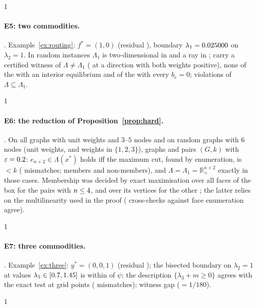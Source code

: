 \documentclass[11pt,a4paper]{article}
\providecommand{\HasCommodity}{0}
\providecommand{\HasHardness}{0}
\providecommand{\HasThree}{0}
\providecommand{\HasRouting}{0}
\theoremstyle{plain}
\theoremstyle{definition}
\theoremstyle{remark}
\newcommand{\R}{\mathbb{R}}
\newcommand{\Lam}{\Lambda}
\newcommand{\Lone}{\Lambda_{1}}
\begin{document}
\if\HasCommodity1
\paragraph{E5: two commodities.} \CritCommodity. Example~\ref{ex:routing}: $f^*=(1,0)$ (residual \CmResidual), boundary $\lambda_1=0.025000$ on $\lambda_2=1$. In \CmRandInst{} random instances $\Lone$ is two-dimensional in \CmRandLoneDimTwo{} and a ray in \CmRandLoneRay; \CmRandWit{} carry a certified witness of $\Lam\ne\Lone$ (\CmRandWitInterior{} at a direction with both weights positive), none of the \CmRandIntInst{} with an interior equilibrium and \CmRandZeroBWit{} of the \CmRandZeroB{} with every $b_e=0$; \CmRandViol{} violations of $\Lam\subseteq\Lone$.
\fi

\if\HasHardness1
\paragraph{E6: the reduction of Proposition~\ref{prop:hard}.} \CritHardness. On all graphs with unit weights and $3$--$5$ nodes and on random graphs with $6$ nodes (unit weights, and weights in $\{1,2,3\}$), \HdGraphs{} graphs and \HdPairs{} pairs $(G,k)$ with $\varepsilon=0.2$: $e_{n+2}\in\Lam(x^*)$ holds iff the maximum cut, found by enumeration, is $<k$ (\HdMism{} mismatches; \HdMember{} members and \HdNonmember{} non-members), and $\Lam=\Lone=\R^{n+2}_+$ exactly in those cases. Membership was decided by exact maximisation over all faces of the box for the \HdFacePairs{} pairs with $n\le4$, and over its vertices for the other \HdVertexPairs{}; the latter relies on the multilinearity used in the proof (\HdXcheck{} cross-checks against face enumeration agree).
\fi

\if\HasThree1
\paragraph{E7: three commodities.} \CritThree. Example~\ref{ex:three}: $y^*=(0,0,1)$ (residual \TcResidual); the bisected boundary on $\lambda_2=1$ at \TcSlicePts{} values $\lambda_1\in[0.7,1.45]$ is within \TcBoundaryDiff{} of $\psi$; the description $\{\lambda_3+m\ge0\}$ agrees with the exact test at \TcDescTests{} grid points (\TcDescMism{} mismatches); witness gap \TcWitGap{} ($=1/180$).
\fi

\if\HasRouting1
\end{document}
